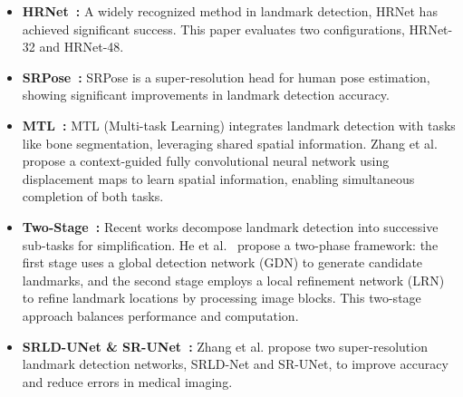 \begin{itemize}
    \item \textbf{HRNet~\cite{HRnet}:} A widely recognized method in landmark detection, HRNet has achieved significant success. This paper evaluates two configurations, HRNet-32 and HRNet-48.
    \item \textbf{SRPose~\cite{SRpose}:} SRPose is a super-resolution head for human pose estimation, showing significant improvements in landmark detection accuracy.
    \item \textbf{MTL~\cite{Zhang2019ContextguidedFC}:} MTL (Multi-task Learning) integrates landmark detection with tasks like bone segmentation, leveraging shared spatial information. Zhang et al.~\cite{Zhang2019ContextguidedFC} propose a context-guided fully convolutional neural network using displacement maps to learn spatial information, enabling simultaneous completion of both tasks.
    \item \textbf{Two-Stage~\cite{HE202115}: } Recent works decompose landmark detection into successive sub-tasks for simplification. He et al.~\cite{HE202115} propose a two-phase framework: the first stage uses a global detection network (GDN) to generate candidate landmarks, and the second stage employs a local refinement network (LRN) to refine landmark locations by processing image blocks. This two-stage approach balances performance and computation.
    \item \textbf{SRLD-UNet \& SR-UNet~\cite{3D-CNN2-sr}:} Zhang et al. propose two super-resolution landmark detection networks, SRLD-Net and SR-UNet, to improve accuracy and reduce errors in medical imaging. 
    
\end{itemize}


